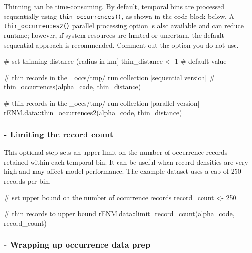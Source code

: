 \documentclass[
  letterpaper,
  DIV=11,
  numbers=noendperiod]{scrartcl}
\newenvironment{Shaded}{\begin{snugshade}}{\end{snugshade}}
\newcommand{\CommentTok}[1]{\textcolor[rgb]{0.37,0.37,0.37}{#1}}
\newcommand{\DecValTok}[1]{\textcolor[rgb]{0.68,0.00,0.00}{#1}}
\newcommand{\FunctionTok}[1]{\textcolor[rgb]{0.28,0.35,0.67}{#1}}
\newcommand{\NormalTok}[1]{\textcolor[rgb]{0.00,0.23,0.31}{#1}}
\newcommand{\OtherTok}[1]{\textcolor[rgb]{0.00,0.23,0.31}{#1}}
\newcommand{\SpecialCharTok}[1]{\textcolor[rgb]{0.37,0.37,0.37}{#1}}
\begin{document}
Thinning can be time-consuming. By default, temporal bins are processed
sequentially using \texttt{thin\_occurrences()}, as shown in the code
block below. A \texttt{thin\_occurrences2()} parallel processing option
is also available and can reduce runtime; however, if system resources
are limited or uncertain, the default sequential approach is
recommended. Comment out the option you do not use.

\begin{Shaded}
\begin{Highlighting}[]
\CommentTok{\# set thinning distance (radius in km)}
\NormalTok{thin\_distance }\OtherTok{\textless{}{-}} \DecValTok{1} \CommentTok{\# default value}

\CommentTok{\# thin records in the \_occs/tmp/ run collection [sequential version]}
\CommentTok{\# thin\_occurrences(alpha\_code, thin\_distance)}

\CommentTok{\# thin records in the \_occs/tmp/ run collection [parallel version]}
\NormalTok{rENM.data}\SpecialCharTok{::}\FunctionTok{thin\_occurrences2}\NormalTok{(alpha\_code, thin\_distance)}
\end{Highlighting}
\end{Shaded}

\subsubsection{- Limiting the record
count}\label{limiting-the-record-count}

This optional step sets an upper limit on the number of occurrence
records retained within each temporal bin. It can be useful when record
densities are very high and may affect model performance. The example
dataset uses a cap of 250 records per bin.

\begin{Shaded}
\begin{Highlighting}[]
\CommentTok{\# set upper bound on the number of occurrence records}
\NormalTok{record\_count }\OtherTok{\textless{}{-}} \DecValTok{250}

\CommentTok{\# thin records to upper bound}
\NormalTok{rENM.data}\SpecialCharTok{::}\FunctionTok{limit\_record\_count}\NormalTok{(alpha\_code, record\_count)}
\end{Highlighting}
\end{Shaded}

\subsubsection{- Wrapping up occurrence data
prep}\label{wrapping-up-occurrence-data-prep}
\end{document}

